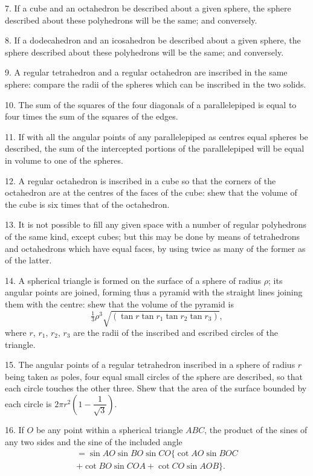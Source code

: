 \documentclass{book}[2004/02/16]
\begin{document}
\begin{mainmatter}
\begin{spacing}{1.3}
7. If a cube and an octahedron be described about a given
sphere, the sphere described about these polyhedrons will be the
same; and conversely.
\medskip

8. If a dodecahedron and an icosahedron be described about
a given sphere, the sphere described about these polyhedrons will
be the same; and conversely.
\medskip

9. A regular tetrahedron and a regular octahedron are inscribed
in the same sphere: compare the radii of the spheres
which can be inscribed in the two solids.
\medskip

10. The sum of the squares of the four diagonals of a parallelepiped
is equal to four times the sum of the squares of the
edges.
\medskip

11. If with all the angular points of any parallelepiped as
centres equal spheres be described, the sum of the intercepted
portions of the parallelepiped will be equal in volume to one of
the spheres.
\medskip

12. A regular octahedron is inscribed in a cube so that the
corners of the octahedron are at the centres of the faces of the
cube: shew that the volume of the cube is six times that of the
octahedron.
\medskip

13. It is not possible to fill any given space with a number
of regular polyhedrons of the same kind, except cubes; but this
may be done by means of tetrahedrons and octahedrons which
have equal faces, by using twice as many of the former as of
the latter.
\medskip

14. A spherical triangle is formed on the surface of a sphere
of radius $\rho$; its angular points are joined, forming thus a pyramid
with the straight lines joining them with the centre: shew that
the volume of the pyramid is
\[
  \tfrac{1}{3}\rho^3\surd{(\tan r\tan{r_1}\tan{r_2}\tan{r_3})},
\]
where $r$, $r_1$, $r_2$, $r_3$ are the radii of the inscribed and escribed circles
of the triangle.
\medskip

15. The angular points of a regular tetrahedron inscribed
in a sphere of radius $r$ being taken as poles, four equal small
circles of the sphere are described, so that each circle touches
the other three. Shew that the area of the surface bounded by
each circle is $2\pi r^2\left( 1 - \dfrac{1}{\surd{3}} \right)$.
\medskip

16. If $O$ be any point within a spherical triangle $ABC$, the
product of the sines of any two sides and the sine of the included
angle
\begin{multline*}
=\sin{AO}\sin{BO}\sin{CO} \biggl\{\cot{AO}\sin{BOC} \\
+\cot{BO}\sin{COA}+\cot{CO}\sin{AOB} \biggr\}.
\end{multline*}


\end{spacing}
\end{mainmatter}
\end{document}
